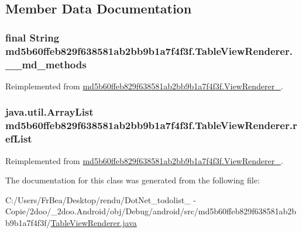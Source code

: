 \subsection{Member Data Documentation}
\hypertarget{classmd5b60ffeb829f638581ab2bb9b1a7f4f3f_1_1_table_view_renderer_bfca855cef125ff9e66a6690bfef09b8}{
\subsubsection[{\_\-\_\-md\_\-methods}]{\setlength{\rightskip}{0pt plus 5cm}final String {\bf md5b60ffeb829f638581ab2bb9b1a7f4f3f.TableViewRenderer.\_\-\_\-md\_\-methods}}}
\label{classmd5b60ffeb829f638581ab2bb9b1a7f4f3f_1_1_table_view_renderer_bfca855cef125ff9e66a6690bfef09b8}




Reimplemented from \hyperlink{classmd5b60ffeb829f638581ab2bb9b1a7f4f3f_1_1_view_renderer__2_80b609e3e4054c380887d4dc2907a875}{md5b60ffeb829f638581ab2bb9b1a7f4f3f.ViewRenderer\_}.\hypertarget{classmd5b60ffeb829f638581ab2bb9b1a7f4f3f_1_1_table_view_renderer_98f8a583ce568ff85385a44cc922c5d1}{
\subsubsection[{refList}]{\setlength{\rightskip}{0pt plus 5cm}java.util.ArrayList {\bf md5b60ffeb829f638581ab2bb9b1a7f4f3f.TableViewRenderer.refList}}}
\label{classmd5b60ffeb829f638581ab2bb9b1a7f4f3f_1_1_table_view_renderer_98f8a583ce568ff85385a44cc922c5d1}




Reimplemented from \hyperlink{classmd5b60ffeb829f638581ab2bb9b1a7f4f3f_1_1_view_renderer__2_6c151401977148a92c515e9c7de1aaf8}{md5b60ffeb829f638581ab2bb9b1a7f4f3f.ViewRenderer\_}.

The documentation for this class was generated from the following file:\begin{CompactItemize}
\item 
C:/Users/FrBea/Desktop/rendu/DotNet\_\-todolist\_ - Copie/2doo/\_\-2doo.Android/obj/Debug/android/src/md5b60ffeb829f638581ab2bb9b1a7f4f3f/\hyperlink{_table_view_renderer_8java}{TableViewRenderer.java}\end{CompactItemize}
